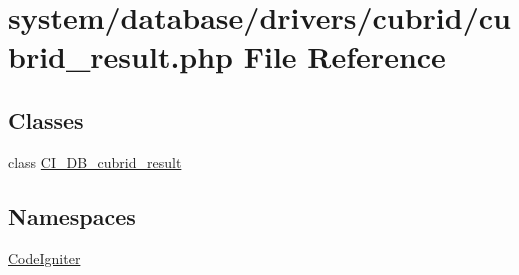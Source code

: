 \hypertarget{cubrid__result_8php}{}\section{system/database/drivers/cubrid/cubrid\+\_\+result.php File Reference}
\label{cubrid__result_8php}
\subsection*{Classes}
\begin{DoxyCompactItemize}
\item 
class \mbox{\hyperlink{class_c_i___d_b__cubrid__result}{C\+I\+\_\+\+D\+B\+\_\+cubrid\+\_\+result}}
\end{DoxyCompactItemize}
\subsection*{Namespaces}
\begin{DoxyCompactItemize}
\item 
 \mbox{\hyperlink{namespace_code_igniter}{Code\+Igniter}}
\end{DoxyCompactItemize}
